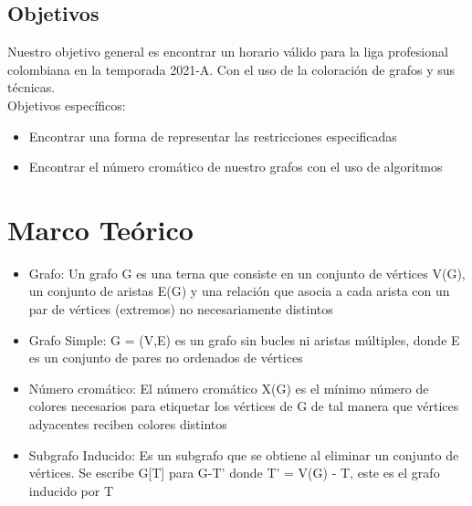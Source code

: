 \documentclass[11pt]{article}
\begin{document}
\begin{multicols}{2}
            \subsection{Objetivos}
                Nuestro objetivo general es encontrar un horario válido para la liga profesional colombiana en la temporada 2021-A. Con el uso de la coloración 
                de grafos y sus técnicas.\\[10pt]
        
                Objetivos específicos:
                \begin{itemize}
                    \item Encontrar una forma de representar las restricciones especificadas 
                    \item Encontrar el número cromático de nuestro grafos con el uso de algoritmos 
                \end{itemize}

        \section{Marco Teórico}

            \begin{itemize}
                \item Grafo: Un grafo G es una terna que consiste en un conjunto de vértices V(G), un conjunto 
                de aristas E(G) y una relación que asocia a cada arista con un par de vértices (extremos) 
                no necesariamente distintos
                \item Grafo Simple: G = (V,E) es un grafo sin bucles ni aristas múltiples, donde E es un conjunto 
                de pares no ordenados de vértices
                \item Número cromático: El número cromático X(G) es el mínimo número de colores necesarios 
                para etiquetar los vértices de G de tal manera que vértices adyacentes reciben colores 
                distintos
                \item Subgrafo Inducido: Es un subgrafo que se obtiene al eliminar un conjunto de vértices. Se 
                escribe G[T] para G-T’ donde T’ = V(G) - T, este es el grafo inducido por T                 
            \end{itemize}
        

\end{multicols}
\end{document}

